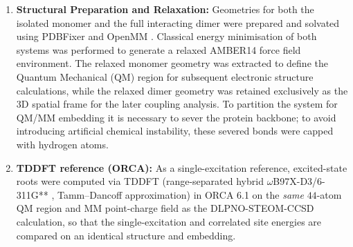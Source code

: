 \documentclass[journal=jpcbfk, manuscript=article, layout=twocolumn, doi=true]{achemso}
\begin{document}
\begin{enumerate}
    \item \textbf{Structural Preparation and Relaxation:} Geometries for both the isolated monomer and the full interacting dimer were prepared and solvated using PDBFixer \cite{openmm2017} and OpenMM \cite{openmm2017}. Classical energy minimisation of both systems was performed to generate a relaxed AMBER14 \cite{amber14_manual} force field environment. The relaxed monomer geometry was extracted to define the Quantum Mechanical (QM) region for subsequent electronic structure calculations, while the relaxed dimer geometry was retained exclusively as the 3D spatial frame for the later coupling analysis. To partition the system for QM/MM embedding it is necessary to sever the protein backbone; to avoid introducing artificial chemical instability, these severed bonds were capped with hydrogen atoms.

    \item \textbf{TDDFT reference (ORCA):} As a single-excitation reference, excited-state roots were computed via TDDFT (range-separated hybrid $\omega$B97X-D3/6-311G** \cite{mardirossian2017}, Tamm--Dancoff approximation) in ORCA 6.1 \cite{neese2020orca,neese2022orca} on the \emph{same} $44$-atom QM region and MM point-charge field as the DLPNO-STEOM-CCSD calculation, so that the single-excitation and correlated site energies are compared on an identical structure and embedding.


\end{enumerate}
\end{document}
